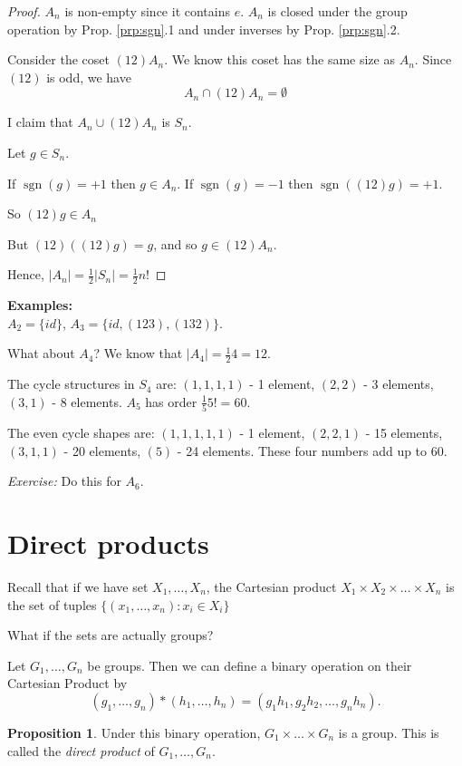 \documentclass{article}
\theoremstyle{definition}
\newtheorem{proposition}[theorem]{Proposition}
\DeclareMathOperator{\sgn}{sgn}
\begin{document}
\begin{proof}
  $A_n$ is non-empty since it contains $e$. $A_n$ is closed under the group operation by Prop. \ref{prp:sgn}.1 and under inverses by Prop. \ref{prp:sgn}.2.

  Consider the coset $(12) A_n$. We know this coset has the same size as $A_n.$ Since $(1 2)$ is odd, we have
\begin{equation*}
  A_n \cap (1 2) A_n  = \emptyset
\end{equation*}

I claim that $A_n \cup (1 2) A_n $ is $S_n$. 

Let $g \in S_n$.

If $\sgn(g) = +1$ then $g \in A_n$.
If $\sgn(g) = -1$ then $\sgn\left( (12) g \right)= +1$.

So $(12)g \in A_n$

But $(1 2)\left( (1 2) g \right)=g$, and so $g \in (1 2)A_n$.

Hence, $|A_n|=\frac{1}{2}|S_n|=\frac{1}{2}n!$

\end{proof}

\textbf{Examples:}\\
$A_2 = \{ id \}$, $A_3 = \{id, (123), (132)\}$.

What about $A_4$? We know that $|A_4|=\frac{1}{2}4=12$.

The cycle structures in $S_4$ are:
$(1,1,1,1)$ - 1 element, $(2,2)$ - 3 elements, $(3,1)$ - 8 elements.
$A_5$ has order $\frac{1}{5}5! = 60$.

The even cycle shapes are:
$(1,1,1,1,1)$ - 1 element, $(2,2,1)$ - 15 elements, $(3,1,1)$ - 20 elements, $(5)$ - 24 elements. These four numbers add up to 60.

\emph{Exercise:} Do this for $A_6$.

\section{Direct products}
Recall that if we have set $X_1, \ldots, X_n$, the Cartesian product 
$X_1 \times X_2 \times \ldots \times X_n$ is the set of tuples $\{(x_1, \ldots,x_n) : x_i \in X_i\}$

What if the sets are actually groups?

Let $G_1 , \ldots, G_n$ be groups. Then we can define a binary operation on their Cartesian Product by
$$(g_1, \ldots, g_n) * (h_1, \ldots , h_n) = (g_1h_1, g_2h_2, \ldots, g_nh_n).$$
\begin{proposition}
Under this binary operation, $G_1 \times \ldots \times G_n$ is a group. This is called the \textit{direct product} of $G_1 , \ldots, G_n$.
\end{proposition}
\end{document}
